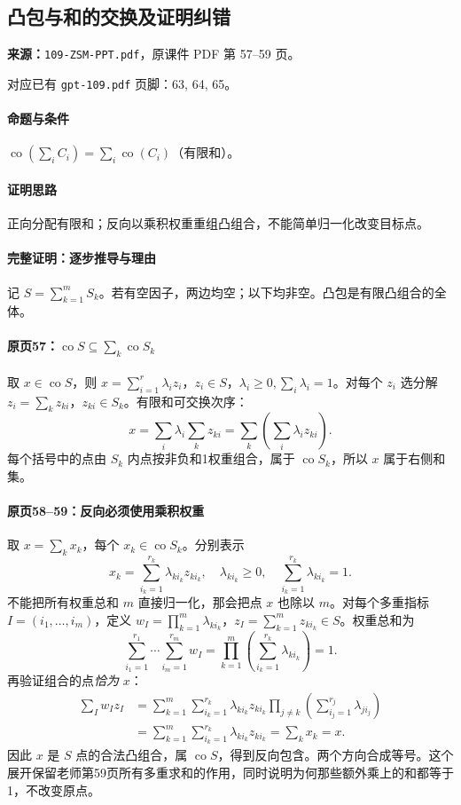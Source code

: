 \clearpage\subsection{凸包与和的交换及证明纠错}
\textbf{来源：}\texttt{109-ZSM-PPT.pdf}，原课件 PDF 第 57--59 页。\par
对应已有 \texttt{gpt-109.pdf} 页脚：63, 64, 65。\par
\paragraph{命题与条件}$\operatorname{co}(\sum_i C_i)=\sum_i\operatorname{co}(C_i)$（有限和）。
\paragraph{证明思路}正向分配有限和；反向以乘积权重重组凸组合，不能简单归一化改变目标点。
\paragraph{完整证明：逐步推导与理由}

记 $S=\sum_{k=1}^m S_k$。若有空因子，两边均空；以下均非空。凸包是有限凸组合的全体。
\paragraph{原页57：$\operatorname{co}S\subseteq\sum_k\operatorname{co}S_k$}
取 $x\in\operatorname{co}S$，则 $x=\sum_{i=1}^r\lambda_i z_i$，$z_i\in S$，$\lambda_i\ge0,\sum_i\lambda_i=1$。对每个 $z_i$ 选分解 $z_i=\sum_kz_{ki}$，$z_{ki}\in S_k$。有限和可交换次序：
\[x=\sum_i\lambda_i\sum_kz_{ki}=\sum_k\left(\sum_i\lambda_i z_{ki}\right).\]
每个括号中的点由 $S_k$ 内点按非负和1权重组合，属于 $\operatorname{co}S_k$，所以 $x$ 属于右侧和集。
\paragraph{原页58--59：反向必须使用乘积权重}
取 $x=\sum_k x_k$，每个 $x_k\in\operatorname{co}S_k$。分别表示
\[x_k=\sum_{i_k=1}^{r_k}\lambda_{k i_k}z_{k i_k},\quad \lambda_{k i_k}\ge0,\quad\sum_{i_k=1}^{r_k}\lambda_{k i_k}=1.\]
不能把所有权重总和 $m$ 直接归一化，那会把点 $x$ 也除以 $m$。对每个多重指标 $I=(i_1,\ldots,i_m)$，定义 $w_I=\prod_{k=1}^m\lambda_{k i_k}$，$z_I=\sum_{k=1}^m z_{k i_k}\in S$。权重总和为
\[\sum_{i_1=1}^{r_1}\cdots\sum_{i_m=1}^{r_m}w_I=\prod_{k=1}^m\left(\sum_{i_k=1}^{r_k}\lambda_{k i_k}\right)=1.\]
再验证组合的点\emph{恰为} $x$：
\begin{align*}
\sum_Iw_Iz_I
&=\sum_{k=1}^m\sum_{i_k=1}^{r_k}\lambda_{k i_k}z_{k i_k}
\prod_{j\ne k}\left(\sum_{i_j=1}^{r_j}\lambda_{j i_j}\right)\\
&=\sum_{k=1}^m\sum_{i_k=1}^{r_k}\lambda_{k i_k}z_{k i_k}
=\sum_kx_k=x.
\end{align*}
因此 $x$ 是 $S$ 点的合法凸组合，属 $\operatorname{co}S$，得到反向包含。两个方向合成等号。这个展开保留老师第59页所有多重求和的作用，同时说明为何那些额外乘上的和都等于1，不改变原点。

